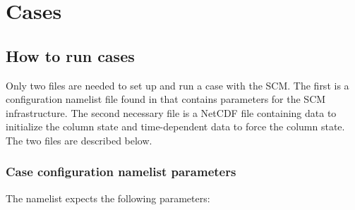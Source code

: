 \chapter{Cases}
\label{chapter: cases}

\section{How to run cases}
Only two files are needed to set up and run a case with the SCM. The first is a configuration namelist file found in  that contains parameters for the SCM infrastructure. The second necessary file is a NetCDF file containing data to initialize the column state and time-dependent data to force the column state. The two files are described below.

\subsection{Case configuration namelist parameters}
\label{subsection: case config}
The  namelist expects the following parameters:
